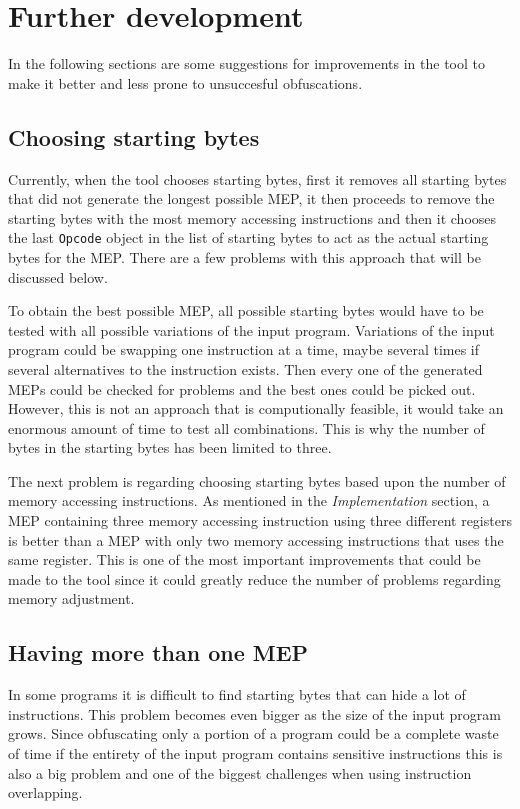 \documentclass[11pt,twoside]{eitExjobb}
\begin{document}
\section{Further development}
In the following sections are some suggestions for improvements in the tool to make it better and less prone to unsuccesful obfuscations.

\subsection{Choosing starting bytes}
Currently, when the tool chooses starting bytes, first it removes all starting bytes that did not generate the longest possible MEP, it then proceeds to remove the starting bytes with the most memory accessing instructions and then it chooses the last \texttt{Opcode} object in the list of starting bytes to act as the actual starting bytes for the MEP. There are a few problems with this approach that will be discussed below.

To obtain the best possible MEP, all possible starting bytes would have to be tested with all possible variations of the input program. Variations of the input program could be swapping one instruction at a time, maybe several times if several alternatives to the instruction exists. Then every one of the generated MEPs could be checked for problems and the best ones could be picked out. However, this is not an approach that is computionally feasible, it would take an enormous amount of time to test all combinations. This is why the number of bytes in the starting bytes has been limited to three.

The next problem is regarding choosing starting bytes based upon the number of memory accessing instructions. As mentioned in the \emph{Implementation} section, a MEP containing three memory accessing instruction using three different registers is better than a MEP with only two memory accessing instructions that uses the same register. This is one of the most important improvements that could be made to the tool since it could greatly reduce the number of problems regarding memory adjustment.

\subsection{Having more than one MEP}
In some programs it is difficult to find starting bytes that can hide a lot of instructions. This problem becomes even bigger as the size of the input program grows. Since obfuscating only a portion of a program could be a complete waste of time if the entirety of the input program contains sensitive instructions this is also a big problem and one of the biggest challenges when using instruction overlapping.
\end{document}
